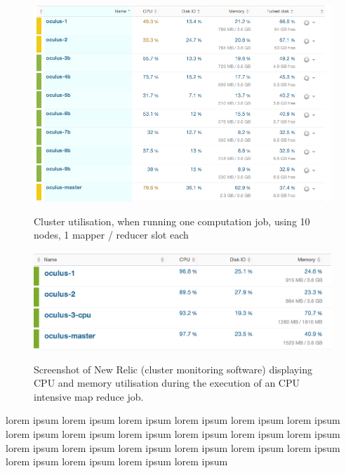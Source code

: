 \begin{figure}[ch!]
  \centering
  \includegraphics[width=\textwidth]{img/hadoop/10nodes-newrelic-suffering-from-no-data-locallity}
  \label{fig:ten-under-utilised-cluster}
  \caption{Cluster utilisation, when running one computation job, using 10 nodes, 1 mapper / reducer slot each}
\end{figure}

\begin{figure}[ch!]
  \centering
  \includegraphics[width=\textwidth]{img/hadoop/monitoring-during-processing}
  \label{fig:cpu-load-during-job}
  \caption{Screenshot of New Relic (cluster monitoring software) displaying CPU and memory utilisation during the execution of an CPU intensive map reduce job.}
\end{figure}

lorem ipsum lorem ipsum lorem ipsum lorem ipsum lorem ipsum lorem ipsum lorem ipsum lorem ipsum lorem ipsum lorem ipsum lorem ipsum lorem ipsum lorem ipsum lorem ipsum lorem ipsum lorem ipsum lorem ipsum lorem ipsum lorem ipsum lorem ipsum lorem ipsum lorem ipsum 

